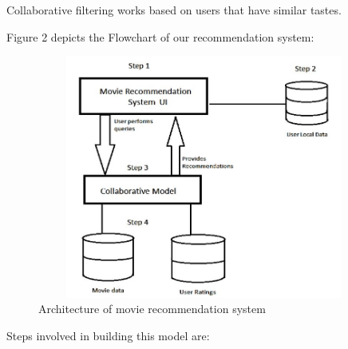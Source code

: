 \documentclass{article}
\begin{document}
Collaborative filtering works based on users that have similar tastes. 

\begin{flushleft}
Figure 2 depicts the Flowchart of our recommendation system:
\end{flushleft}

\begin{figure}[htp]
    \centering
    \Large\includegraphics[width=11cm, height=8cm]{Flowchart.JPG}
    \caption{Architecture of movie recommendation system}
    \label{fig:Flowchart}
\end{figure}


\begin{flushleft}
Steps involved in building this model are:
\end{flushleft}
\end{document}
